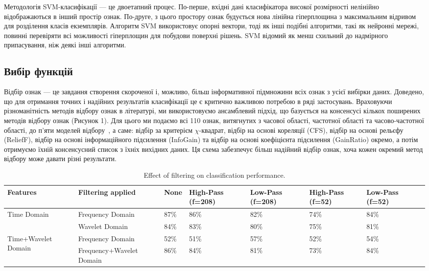 \documentclass[]{iptconf}
\begin{document}
Методологія SVM-класифікації --- це двоетапний процес. По-перше, вхідні дані класифікатора високої розмірності нелінійно відображаються в інший простір ознак. По-друге, з цього простору ознак будується нова лінійна гіперплощина з максимальним відривом для розділення класів екземплярів. Алгоритм SVM використовує опорні вектори, тоді як інші подібні алгоритми, такі як нейронні мережі, повинні перевіряти всі можливості гіперплощин для побудови поверхні рішень. SVM відомий як менш схильний до надмірного припасування, ніж деякі інші алгоритми.

\subsection{Вибір функцій}

Відбір ознак --- це завдання створення скороченої і, можливо, більш інформативної підмножини всіх ознак з усієї вибірки даних. Доведено, що для отримання точних і надійних результатів класифікації це є критично важливою потребою в ряді застосувань\cite{11, 12}. Враховуючи різноманітність методів відбору ознак в літературі, ми використовуємо ансамблевий підхід, що базується на консенсусі кількох поширених методів відбору ознак (Рисунок 1). Для цього ми подаємо всі 110 ознак, витягнутих з часової області, частотної області та часово-частотної області, до п'яти моделей відбору~\cite{11}, а саме: відбір за критерієм $\chi$-квадрат, відбір на основі кореляції (CFS), відбір на основі рельєфу (ReliefF), відбір на основі інформаційного підсилення (InfoGain) та відбір на основі коефіцієнта підсилення (GainRatio) окремо, а потім отримуємо їхній консенсусний список з їхніх вихідних даних. Ця схема забезпечує більш надійний відбір ознак, хоча кожен окремий метод відбору може давати різні результати.


\begin{table}[ht]
\centering
\caption{Effect of filtering on classification performance.}
\begin{tabular}{|l|l|l|l|l|l|l|l|}
\hline
Features & Filtering applied & None & High-Pass (f=208) & Low-Pass (f=208) & High-Pass (f=52) & Low-Pass (f=52) \\
\hline
\multirow{2}{*}{Time Domain} & Frequency Domain & 87\% & 86\% & 82\% & 74\% & 84\% \\
\cline{2-7}
& Wavelet Domain & 84\% & 83\% & 80\% & 75\% & 81\% \\
\hline
\multirow{2}{*}{Time+Wavelet Domain} & Frequency Domain & 52\% & 51\% & 57\% & 52\% & 54\% \\
\cline{2-7}
& Frequency+Wavelet Domain & 86\% & 84\% & 81\% & 73\% & 84\% \\
\hline
\end{tabular}
\end{table}
\end{document}
